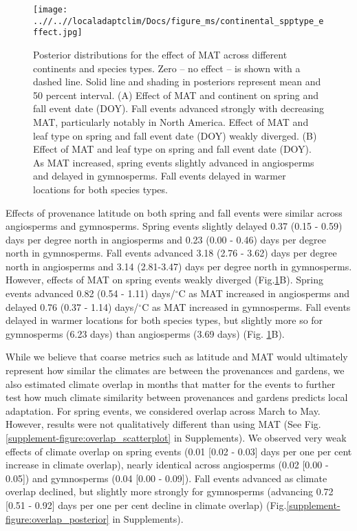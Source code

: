 \documentclass{article}
\begin{document}
\begin{figure}[!h] 
    \centering
 \texttt{[image: ..//..//localadaptclim/Docs/figure\_ms/continental\_spptype\_effect.jpg]}
    \caption{Posterior distributions for the effect of MAT across different continents and species types. Zero -- no effect -- is shown with a dashed line. Solid line and shading in posteriors represent mean and 50 percent interval. (A) Effect of MAT and continent on spring and fall event date (DOY). Fall events advanced strongly with decreasing MAT, particularly notably in North America. Effect of MAT and leaf type on spring and fall event date (DOY) weakly diverged. (B) Effect of MAT and leaf type on spring and fall event date (DOY). As MAT increased, spring events slightly advanced in angiosperms and delayed in gymnosperms. Fall events delayed in warmer locations for both species types.}
    \label{figure:continental_spptype_effect}
\end{figure}

Effects of provenance latitude on both spring and fall events were similar across angiosperms and gymnosperms.
Spring events slightly delayed 0.37 (0.15 - 0.59) days per degree north in angiosperms and 0.23 (0.00 - 0.46) days per degree north in gymnosperms. Fall events advanced 3.18 (2.76 - 3.62) days per degree north in angiosperms and 3.14 (2.81-3.47) days per degree north in gymnosperms.
However, effects of MAT on spring events weakly diverged (Fig.\ref{figure:continental_spptype_effect}B). Spring events advanced 0.82 (0.54 - 1.11) days/$^{\circ}$C as MAT increased in angiosperms and delayed 0.76 (0.37 - 1.14) days/$^{\circ}$C as MAT increased in gymnosperms. Fall events delayed in warmer locations for both species types, but slightly more so for gymnosperms (6.23 days) than angiosperms (3.69 days) (Fig. \ref{figure:continental_spptype_effect}B).

While we believe that coarse metrics such as latitude and MAT would ultimately represent how similar the climates are between the provenances and gardens, we also estimated climate overlap in months that matter for the events to further test how much climate similarity between provenances and gardens predicts local adaptation. For spring events, we considered overlap across March to May. However, results were not qualitatively different than using MAT (See Fig. \ref{supplement-figure:overlap_scatterplot} in Supplements). We observed very weak effects of climate overlap on spring events (0.01 [0.02 - 0.03] days per one per cent increase in climate overlap), nearly identical across angiosperms (0.02 [0.00 - 0.05]) and gymnosperms (0.04 [0.00 - 0.09]). Fall events advanced as climate overlap declined, but slightly more strongly for gymnosperms (advancing 0.72 [0.51 - 0.92] days per one per cent decline in climate overlap) (Fig.\ref{supplement-figure:overlap_posterior} in Supplements).
\end{document}
